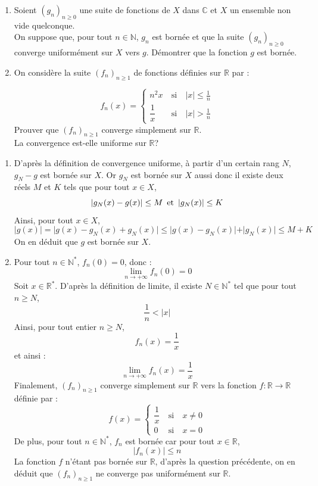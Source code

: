 \documentclass[a4paper,10pt]{report}
\begin{document}
\medskip
\begin{Exercice}{} 
\begin{enumerate}

\item Soient $(g_n)_{n \geq 0}$ une suite de fonctions de $X$ dans $\mathbb{C}$ et $X$ un ensemble non vide quelconque.\\
On suppose que, pour tout $n\in \mathbb{N}$, $g_n$ est bornée et que la suite $(g_n)_{n \geq 0}$ converge uniformément sur $X$ vers $g$. Démontrer que la fonction  $g$ est bornée.
\item
On considère la suite  $(f_n)_{n \geq 1}$ de fonctions  définies sur $\mathbb{R}$ par : 

$$f_n(x)=\left\lbrace \begin{array}{lll}
n^2x&\:\text{si}\:&|x|\leq \frac{1}{n}\\[0.3cm]
\dfrac{1}{x}&\:\text{si}\:&|x|>\frac{1}{n}
\end{array}\right.$$
Prouver que $(f_n)_{n \geq 1}$  converge simplement sur $\mathbb{R}$.\\
La convergence est-elle uniforme sur $\mathbb{R}$?

\end{enumerate}
\end{Exercice}

\newpage

\corr \begin{enumerate}

\item D'après la définition de convergence uniforme, à partir d'un certain rang $N$, $g_N-g$ est bornée sur $X$. Or $g_N$ est bornée sur $X$ aussi donc il existe deux réels $M$ et $K$ tels que pour tout $x \in X$,
$$ \vert g_N(x)-g(x) \vert \leq M \, \hbox{ et } \,  \vert g_N(x) \vert \leq K$$
Ainsi, pour tout $x \in X$,
$$ \vert g(x) \vert = \vert g(x)-g_N(x) + g_N(x) \vert \leq \vert g(x)-g_N(x) \vert + \vert g_N(x) \vert \leq M+K$$
On en déduit que $g$ est bornée sur $X$.
\item Pour tout $n\in\mathbb{N}^*$, $f_n(0)=0$, donc :
$$\lim\limits_{n\to +\infty}f_n(0)=0$$
Soit $x\in\mathbb{R}^*$. D'après la définition de limite, il existe $N \in \mathbb{N}^*$ tel que pour tout $n \geq N$,
$$ \dfrac{1}{n}<|x|$$
Ainsi, pour tout entier $n \geq N$,
$$ f_n(x)=\dfrac{1}{x}$$
et ainsi :
$$\lim\limits_{n\to +\infty}^{}f_n(x)=\dfrac{1}{x}$$
Finalement, $(f_n)_{n \geq 1}$  converge simplement sur $\mathbb{R}$ vers la fonction $f : \mathbb{R} \rightarrow \mathbb{R}$ définie par :
$$f(x)=\left\lbrace \begin{array}{lll}
\dfrac{1}{x}&\:\text{si}\:&x\neq 0\\[0.3cm]
0&\:\text{si}\:&x=0
\end{array}\right. $$
De plus, pour tout $n\in\mathbb{N}^*$, $f_n$ est bornée car pour tout $x \in \mathbb{R}$,
$$|f_n(x)|\leq n$$
La fonction $f$ n'étant pas bornée sur $\mathbb{R}$, d'après la question précédente,  on en déduit que $(f_n)_{n \geq 1}$  ne converge pas uniformément sur $\mathbb{R}$.
\end{enumerate}
\end{document}

